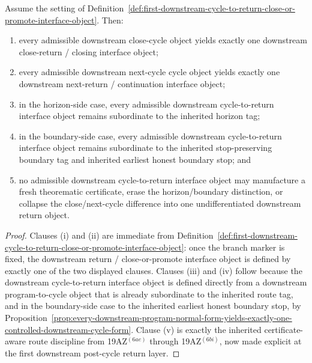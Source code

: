\begin{proposition}
\label{prop:every-downstream-cycle-object-yields-exactly-one-downstream-return-close-or-promote-interface-object}
Assume the setting of Definition~\ref{def:first-downstream-cycle-to-return-close-or-promote-interface-object}. Then:
\begin{enumerate}[label=(\roman*)]
  \item every admissible downstream close-cycle object yields exactly one downstream close-return / closing interface object;
  \item every admissible downstream next-cycle cycle object yields exactly one downstream next-return / continuation interface object;
  \item in the horizon-side case, every admissible downstream cycle-to-return interface object remains subordinate to the inherited horizon tag;
  \item in the boundary-side case, every admissible downstream cycle-to-return interface object remains subordinate to the inherited stop-preserving boundary tag and inherited earliest honest boundary stop; and
  \item no admissible downstream cycle-to-return interface object may manufacture a fresh theorematic certificate, erase the horizon/boundary distinction, or collapse the close/next-cycle difference into one undifferentiated downstream return object.
\end{enumerate}
\end{proposition}

\begin{proof}
Clauses (i) and (ii) are immediate from Definition~\ref{def:first-downstream-cycle-to-return-close-or-promote-interface-object}: once the branch marker is fixed, the downstream return / close-or-promote interface object is defined by exactly one of the two displayed clauses. Clauses (iii) and (iv) follow because the downstream cycle-to-return interface object is defined directly from a downstream program-to-cycle object that is already subordinate to the inherited route tag, and in the boundary-side case to the inherited earliest honest boundary stop, by Proposition~\ref{prop:every-downstream-program-normal-form-yields-exactly-one-controlled-downstream-cycle-form}. Clause (v) is exactly the inherited certificate-aware route discipline from 19AZ$^{(6ae)}$ through 19AZ$^{(6bi)}$, now made explicit at the first downstream post-cycle return layer.
\end{proof}

